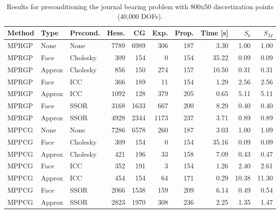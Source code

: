 \documentclass[11pt]{article}
\theoremstyle{plain}
\theoremstyle{definition}
\begin{document}
\begin{table}[htbp]
\centering
\begin{tabular}{l *{2}{|l} *{7}{|r}}
  Method & Type & Precond. & Hess. & CG & Exp. & Prop. & Time [s] & $S_b$ & $S_M$\\\hline
MPRGP & None & None & 7789 & 6989 & 306 & 187 & 3.30 & 1.00 & 1.00\\ \hline
MPRGP & Face & Cholesky & 309 & 154 & 0 & 154 & 35.22 & 0.09 & 0.09\\
MPRGP & Approx & Cholesky & 856 & 150 & 274 & 157 & 10.50 & 0.31 & 0.31\\ \hline
MPRGP & Face & ICC & 366 & 189 & 11 & 154 & 1.29 & 2.56 & 2.56\\
MPRGP & Approx & ICC & 1092 & 128 & 379 & 205 & 0.65 & 5.11 & 5.11\\ \hline
MPRGP & Face & SSOR & 3168 & 1633 & 667 & 200 & 8.29 & 0.40 & 0.40\\
MPRGP & Approx & SSOR & 4928 & 2344 & 1173 & 237 & 3.71 & 0.89 & 0.89\\ \hline \hline
MPPCG & None & None & 7286 & 6578 & 260 & 187 & 3.03 & 1.00 & 1.09\\ \hline
MPPCG & Face & Cholesky & 309 & 154 & 0 & 154 & 35.16 & 0.09 & 0.09\\
MPPCG & Approx & Cholesky & 421 & 196 & 33 & 158 & 7.09 & 0.43 & 0.47\\ \hline
MPPCG & Face & ICC & 352 & 191 & 3 & 154 & 1.26 & 2.40 & 2.61\\
MPPCG & Approx & ICC & 454 & 154 & 64 & 171 & 0.29 & 10.38 & 11.30\\ \hline
MPPCG & Face & SSOR & 2066 & 1538 & 159 & 209 & 6.14 & 0.49 & 0.54\\
MPPCG & Approx & SSOR & 2823 & 1970 & 308 & 236 & 2.25 & 1.35 & 1.47\\
\end{tabular}
\caption[Preconditioned journal bearing problem II.]{Results for preconditioning the journal bearing problem with 800x50 discretization points (40,000 DOFs).}
\label{tab:precondJb2}
\end{table}
\end{document}
